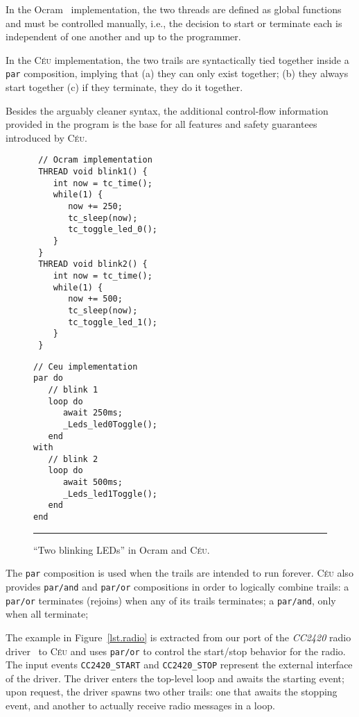 \documentclass[10pt]{sensys-proc}
\newcommand{\CEU}{\textsc{C\'{e}u}\xspace}
\newcommand{\code}[1] {{\small{\texttt{#1}}}}
\begin{document}
In the Ocram~\cite{wsn.ocram} implementation, the two threads are defined as 
global functions and must be controlled manually, i.e.,
the decision to start or terminate each is independent of one another and up to 
the programmer.

In the \CEU implementation, the two trails are syntactically tied together 
inside a \code{par} composition, implying that
(a) they can only exist together;
(b) they always start together
(c) if they terminate, they do it together.

Besides the arguably cleaner syntax, the additional control-flow information 
provided in the program is the base for all features and safety guarantees 
introduced by \CEU.

\begin{figure}[t]
\begin{minipage}[t]{0.50\linewidth}
{\small
\begin{verbatim}
 // Ocram implementation
 THREAD void blink1() {
    int now = tc_time();
    while(1) {
       now += 250;
       tc_sleep(now);
       tc_toggle_led_0();
    }
 }
 THREAD void blink2() {
    int now = tc_time();
    while(1) {
       now += 500;
       tc_sleep(now);
       tc_toggle_led_1();
    }
 }
\end{verbatim}
}
\end{minipage}
%
\hspace{0.0cm}
%
\begin{minipage}[t]{0.40\linewidth}
{\small
\begin{verbatim}
// Ceu implementation
par do
   // blink 1
   loop do
      await 250ms;
      _Leds_led0Toggle();
   end
with
   // blink 2
   loop do
      await 500ms;
      _Leds_led1Toggle();
   end
end
\end{verbatim}
}
\end{minipage}
\rule{8.5cm}{0.37pt}
\caption{ ``Two blinking LEDs'' in Ocram and \CEU.
\label{lst.blink}
}
\end{figure}

The \code{par} composition is used when the trails are intended to run forever.
\CEU also provides \code{par/and} and \code{par/or} compositions in order to 
logically combine trails:
a \code{par/or}  terminates (rejoins) when any of its trails terminates;
a \code{par/and}, only when all terminate;

The example in Figure~\ref{lst.radio} is extracted from our port of the 
\emph{CC2420} radio driver~\cite{wsn.teps} to \CEU and uses \code{par/or} to 
control the start/stop behavior for the radio.
The input events \code{CC2420\_START} and \code{CC2420\_STOP} represent the 
external interface of the driver.
The driver enters the top-level loop and awaits the starting event;
upon request, the driver spawns two other trails:
one that awaits the stopping event,
and another to actually receive radio messages in a loop.
\end{document}
